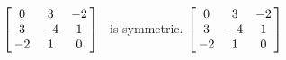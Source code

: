 {$\left[\hskip -3pt \begin{array}{ccc} 0&3&-2\\  3&-4&1
\\  -2&1&0\end{array}\hskip -3pt \right] $} 
{\tta\ is symmetric. $\left[\hskip -3pt \begin{array}{ccc} 0&3&-2\\  3&-4&1\\  -2&1&0\end{array}\hskip -3pt \right] $}


  

